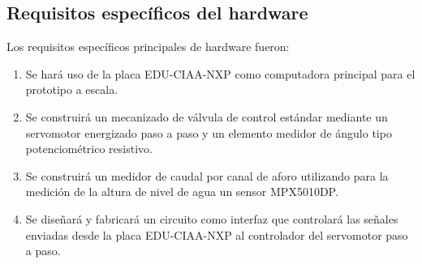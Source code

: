 \subsection{Requisitos específicos del hardware}
\label{subsec:requisitoshw}
 Los requisitos específicos principales de hardware fueron:
\begin{enumerate}
	\item Se hará uso de la placa EDU-CIAA-NXP como computadora principal para el prototipo a escala.
	\item Se construirá un mecanizado de  válvula de control estándar mediante un servomotor energizado paso a paso y un elemento medidor de ángulo tipo potenciométrico resistivo.
	\item Se construirá un medidor de caudal por canal de aforo utilizando para la medición de la altura de nivel de agua un sensor MPX5010DP.
	\item Se diseñará y fabricará un circuito como interfaz que controlará las señales enviadas desde la placa EDU-CIAA-NXP al controlador del servomotor paso a paso. 
\end{enumerate}

